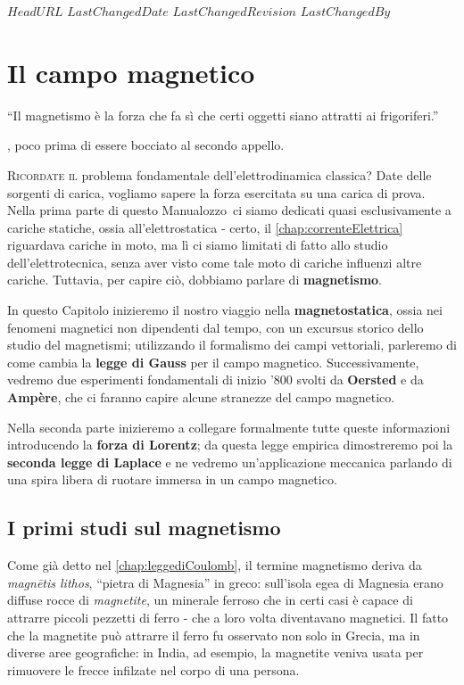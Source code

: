 \svnidlong
{$HeadURL$}
{$LastChangedDate$}
{$LastChangedRevision$}
{$LastChangedBy$}

\chapter{Il campo magnetico}

\begin{introduction}
	``Il magnetismo è la forza che fa sì che certi oggetti siano attratti ai frigoriferi.''
	\begin{flushright}
		, poco prima di essere bocciato al secondo appello.
	\end{flushright}
\end{introduction}
\lettrine[findent=1pt, nindent=0pt]{R}{icordate il} problema fondamentale dell'elettrodinamica classica? Date delle sorgenti di carica, vogliamo sapere la forza esercitata su una carica di prova. Nella prima parte di questo Manualozzo\texttrademark\ ci siamo dedicati quasi esclusivamente a cariche statiche, ossia all'elettrostatica - certo, il \autoref{chap:correnteElettrica} riguardava cariche in moto, ma lì ci siamo limitati di fatto allo studio dell'elettrotecnica, senza aver visto come tale moto di cariche influenzi altre cariche. Tuttavia, per capire ciò, dobbiamo parlare di \textbf{magnetismo}.

In questo Capitolo inizieremo il nostro viaggio nella \textbf{magnetostatica}, ossia nei fenomeni magnetici non dipendenti dal tempo, con un excursus storico dello studio del magnetismi; utilizzando il formalismo dei campi vettoriali, parleremo di come cambia la \textbf{legge di Gauss} per il campo magnetico. Successivamente, vedremo due esperimenti fondamentali  di inizio '800 svolti da \textbf{Oersted} e da \textbf{Ampère}, che ci faranno capire alcune stranezze del campo magnetico.

Nella seconda parte inizieremo a collegare formalmente tutte queste informazioni introducendo la \textbf{forza di Lorentz}; da questa legge empirica dimostreremo poi la \textbf{seconda legge di Laplace} e ne vedremo un'applicazione meccanica parlando di una spira libera di ruotare immersa in un campo magnetico.
\section{I primi studi sul magnetismo}
Come già detto nel \autoref{chap:leggediCoulomb}, il termine magnetismo deriva da \textit{magnētis lithos}, ``pietra di Magnesia'' in greco: sull'isola egea di Magnesia erano diffuse rocce di \textit{magnetite}, un minerale ferroso che in certi casi è capace di attrarre piccoli pezzetti di ferro - che a loro volta diventavano magnetici.
Il fatto che la magnetite può attrarre il ferro fu osservato non solo in Grecia, ma in diverse aree geografiche: in India, ad esempio, la magnetite veniva usata per rimuovere le frecce infilzate nel corpo di una persona.
